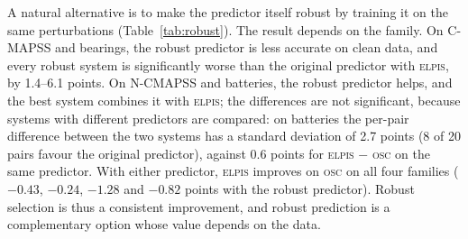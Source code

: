 \documentclass{esannV2}
\newcommand{\OSC}{\textsc{osc}}
\newcommand{\RPT}{\textsc{elpis}}
\begin{document}
A natural alternative is to make the predictor itself robust by training it on the same perturbations (Table~\ref{tab:robust}). The result depends on the family. On C-MAPSS and bearings, the robust predictor is less accurate on clean data, and every robust system is significantly worse than the original predictor with \RPT, by 1.4--6.1 points. On N-CMAPSS and batteries, the robust predictor helps, and the best system combines it with \RPT; the differences are not significant, because systems with different predictors are compared: on batteries the per-pair difference between the two systems has a standard deviation of 2.7 points (8 of 20 pairs favour the original predictor), against 0.6 points for \RPT{} $-$ \OSC{} on the same predictor. With either predictor, \RPT{} improves on \OSC{} on all four families ($-0.43$, $-0.24$, $-1.28$ and $-0.82$ points with the robust predictor). Robust selection is thus a consistent improvement, and robust prediction is a complementary option whose value depends on the data.
\end{document}
